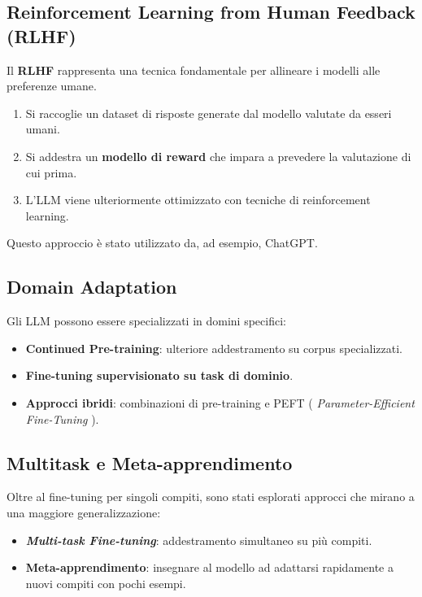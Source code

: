 \subsection{Reinforcement Learning from Human Feedback (RLHF)}
Il \textbf{RLHF} rappresenta una tecnica fondamentale per allineare i modelli alle preferenze umane.
\begin{enumerate}
    \item Si raccoglie un dataset di risposte generate dal modello valutate da esseri umani.
    \item Si addestra un \textbf{modello di reward} che impara a prevedere la valutazione di cui prima.
    \item L'LLM viene ulteriormente ottimizzato con tecniche di reinforcement learning.
\end{enumerate}
Questo approccio è stato utilizzato da, ad esempio, ChatGPT.

\subsection{Domain Adaptation}
Gli LLM possono essere specializzati in domini specifici:
\begin{itemize}
    \item \textbf{Continued Pre-training}: ulteriore addestramento su corpus specializzati.
    \item \textbf{Fine-tuning supervisionato su task di dominio}.
    \item \textbf{Approcci ibridi}: combinazioni di pre-training e PEFT ( \textit{Parameter-Efficient Fine-Tuning} ).
\end{itemize}

\subsection{Multitask e Meta-apprendimento}
Oltre al fine-tuning per singoli compiti, sono stati esplorati approcci che 
mirano a una maggiore generalizzazione:
\begin{itemize}
    \item \textbf{\textit{Multi-task Fine-tuning}}: addestramento simultaneo su più compiti.
    \item \textbf{Meta-apprendimento}: insegnare al modello ad adattarsi rapidamente a nuovi compiti con pochi esempi.
\end{itemize}

